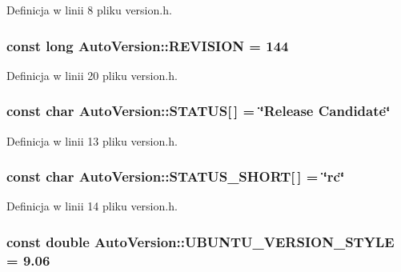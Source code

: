 Definicja w linii 8 pliku version.h.\hypertarget{a00019_e2d1fcdc67a4319c421677ebe1ef4d09}{
\subsubsection[{REVISION}]{\setlength{\rightskip}{0pt plus 5cm}const long {\bf AutoVersion::REVISION} = 144}}
\label{dd/da2/a00019_e2d1fcdc67a4319c421677ebe1ef4d09}




Definicja w linii 20 pliku version.h.\hypertarget{a00019_cb58e6df1058868fe3e780122ab30ef1}{
\subsubsection[{STATUS}]{\setlength{\rightskip}{0pt plus 5cm}const char {\bf AutoVersion::STATUS}\mbox{[}$\,$\mbox{]} = \char`\"{}Release Candidate\char`\"{}}}
\label{dd/da2/a00019_cb58e6df1058868fe3e780122ab30ef1}




Definicja w linii 13 pliku version.h.\hypertarget{a00019_dc0aeb82b23e4fa3a91bc1f4d2ab0aed}{
\subsubsection[{STATUS\_\-SHORT}]{\setlength{\rightskip}{0pt plus 5cm}const char {\bf AutoVersion::STATUS\_\-SHORT}\mbox{[}$\,$\mbox{]} = \char`\"{}rc\char`\"{}}}
\label{dd/da2/a00019_dc0aeb82b23e4fa3a91bc1f4d2ab0aed}




Definicja w linii 14 pliku version.h.\hypertarget{a00019_06157f622b974a3180a91ffa5e4fc200}{
\subsubsection[{UBUNTU\_\-VERSION\_\-STYLE}]{\setlength{\rightskip}{0pt plus 5cm}const double {\bf AutoVersion::UBUNTU\_\-VERSION\_\-STYLE} = 9.06}}
\label{dd/da2/a00019_06157f622b974a3180a91ffa5e4fc200}




